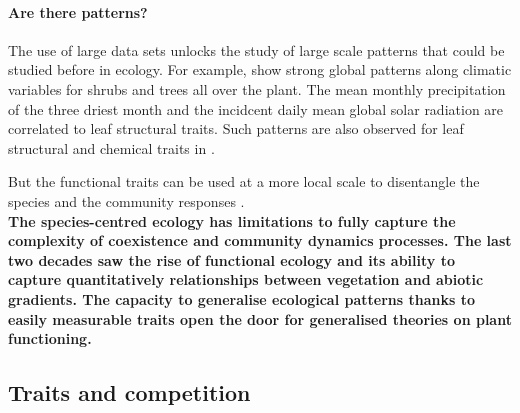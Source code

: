 

\paragraph{Are there patterns?}


The use of large data sets unlocks the study of large scale patterns that could be studied before in ecology. For example, \citet{niinemets_global-scale_2001} show strong global patterns along climatic variables for shrubs and trees all over the plant. The mean monthly precipitation of the three driest month and the incidcent daily mean global solar radiation are correlated to leaf structural traits. Such patterns are also observed for leaf structural and chemical traits in \citet{wright_worldwide_2004}.

But the functional traits can be used at a more local scale to disentangle the species and the community responses \parencite{kichenin_contrasting_2013, jung_intraspecific_2014}.\\
%



\textbf{The species-centred ecology has limitations to fully capture the complexity of coexistence and community dynamics processes. The last two decades saw the rise of functional ecology and its ability to capture quantitatively relationships between vegetation and abiotic gradients. The capacity to generalise ecological patterns thanks to easily measurable traits open the door for generalised theories on plant functioning.}

\subsection{Traits and competition}

